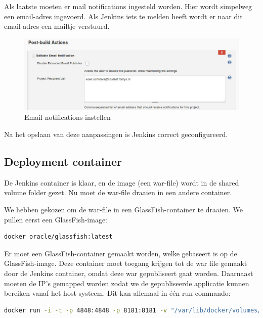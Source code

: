 \documentclass[12pt]{article}
\begin{document}
\noindent Als laatste moeten er mail notifications ingesteld worden. Hier wordt simpelweg een email-adres ingevoerd. Als Jenkins iets te melden heeft wordt er naar dit email-adres een mailtje verstuurd.

\begin{figure}[H]
	\begin{center}
		\includegraphics[width=1.0\textwidth]{images/Postbuildaction.PNG}
		\caption{Email notifications instellen\label{fig:jenkins_config_email_notifications}}
	\end{center}
\end{figure}

\noindent Na het opslaan van deze aanpassingen is Jenkins correct geconfigureerd.

\pagebreak
\subsection{Deployment container}
\noindent De Jenkins container is klaar, en de image (een war-file) wordt in de shared volume folder gezet. Nu moet de war-file draaien in een andere container.

We hebben gekozen om de war-file in een GlassFish-container te draaien. We pullen eerst een GlassFish-image:

\begin{lstlisting}[language=Bash]
docker oracle/glassfish:latest
\end{lstlisting}

\noindent Er moet een GlassFish-container gemaakt worden, welke gebaseert is op de GlassFish-image. Deze container moet toegang krijgen tot de war file gemaakt door de Jenkins container, omdat deze war gepubliseert gaat worden. Daarnaast moeten de IP's gemapped worden zodat we de gepubliseerde applicatie kunnen bereiken vanaf het host systeem. Dit kan allemaal in één run-commando:

\begin{lstlisting}[language=Bash]
docker run -i -t -p 4848:4848 -p 8181:8181 -v "/var/lib/docker/volumes/jenkins_home/_data/workspace/SOP6 Docker/target":/glassfish5/glassfish/domains/domain1/autodeploy oracle/glassfish:latest
\end{lstlisting}
\end{document}

